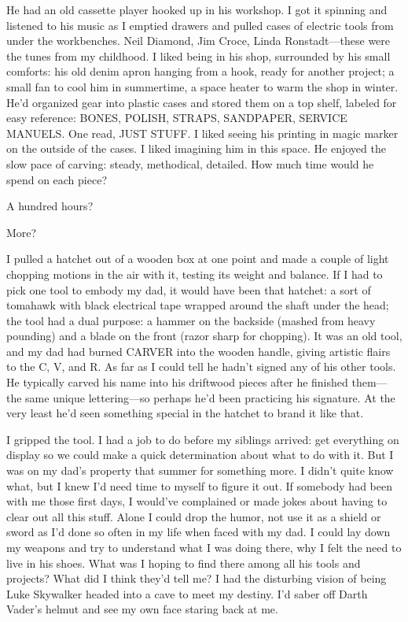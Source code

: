 \documentclass[12pt]{book}
\begin{document}
He had an old cassette player hooked up in his workshop. I got it spinning and listened to his music as I emptied drawers and pulled cases of electric tools from under the workbenches. Neil Diamond, Jim Croce, Linda Ronstadt---these were the tunes from my childhood. I liked being in his shop, surrounded by his small comforts: his old denim apron hanging from a hook, ready for another project; a small fan to cool him in summertime, a space heater to warm the shop in winter. He'd organized gear into plastic cases and stored them on a top shelf, labeled for easy reference: BONES, POLISH, STRAPS, SANDPAPER, SERVICE MANUELS. One read, JUST STUFF. I liked seeing his printing in magic marker on the outside of the cases. I liked imagining him in this space. He enjoyed the slow pace of carving: steady, methodical, detailed. How much time would he spend on each piece?

A hundred hours?

More?

I pulled a hatchet out of a wooden box at one point and made a couple of light chopping motions in the air with it, testing its weight and balance. If I had to pick one tool to embody my dad, it would have been that hatchet: a sort of tomahawk with black electrical tape wrapped around the shaft under the head; the tool had a dual purpose: a hammer on the backside (mashed from heavy pounding) and a blade on the front (razor sharp for chopping). It was an old tool, and my dad had burned CARVER into the wooden handle, giving artistic flairs to the C, V, and R. As far as I could tell he hadn't signed any of his other tools. He typically carved his name into his driftwood pieces after he finished them---the same unique lettering---so perhaps he'd been practicing his signature. At the very least he'd seen something special in the hatchet to brand it like that.

I gripped the tool. I had a job to do before my siblings arrived: get everything on display so we could make a quick determination about what to do with it. But I was on my dad's property that summer for something more. I didn't quite know what, but I knew I'd need time to myself to figure it out. If somebody had been with me those first days, I would've complained or made jokes about having to clear out all this stuff. Alone I could drop the humor, not use it as a shield or sword as I'd done so often in my life when faced with my dad. I could lay down my weapons and try to understand what I was doing there, why I felt the need to live in his shoes. What was I hoping to find there among all his tools and projects? What did I think they'd tell me? I had the disturbing vision of being Luke Skywalker headed into a cave to meet my destiny. I'd saber off Darth Vader's helmut and see my own face staring back at me.
\end{document}
